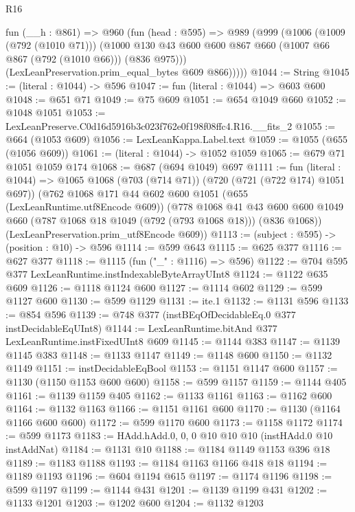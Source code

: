 \begin{lexlean}{R16}
\begin{coremodule}
      fun (__h : @861) =>
      @960
        (fun (head : @595) =>
        @989
          (@999
            (@1006
              (@1009 (@792 (@1010 @71)))
              (@1000 @130 @43 @600 @600 @867 @660 (@1007 @66 @867 (@792 (@1010 @66))) (@836 @975)))
            (LexLeanPreservation.prim_equal_bytes @609 @866)))))
@1044 := String
@1045 := (literal : @1044) -> @596
@1047 := fun (literal : @1044) => @603 @600
@1048 := @651 @71
@1049 := @75 @609
@1051 := @654 @1049 @660
@1052 := @1048 @1051
@1053 := LexLeanPreserve.C0d16d5916b3c023f762e0f198f08ffc4.R16.__fits_2
@1055 := @664 (@1053 @609)
@1056 := LexLeanKappa.Label.text
@1059 := @1055 (@655 (@1056 @609))
@1061 := (literal : @1044) -> @1052 @1059
@1065 := @679 @71 @1051 @1059 @174
@1068 := @687 (@694 @1049) @697
@1111 := fun (literal : @1044) =>
  @1065
    @1068
    (@703 (@714 @71))
    (@720 (@721 (@722 @174) @1051 @697))
    (@762
      @1068
      @171
      @44
      @602
      @600
      @1051
      (@655 (LexLeanRuntime.utf8Encode @609))
      (@778
        @1068
        @41
        @43
        @600
        @600
        @1049
        @660
        (@787 @1068 @18 @1049 (@792 (@793 @1068 @18)))
        (@836 @1068))
      (LexLeanPreservation.prim_utf8Encode @609))
@1113 := (subject : @595) -> (position : @10) -> @596
@1114 := @599 @643
@1115 := @625 @377
@1116 := @627 @377
@1118 := @1115 (fun ("_" : @1116) => @596)
@1122 := @704 @595 @377 LexLeanRuntime.instIndexableByteArrayUInt8
@1124 := @1122 @635 @609
@1126 := @1118 @1124 @600
@1127 := @1114 @602
@1129 := @599 @1127 @600
@1130 := @599 @1129
@1131 := ite.{1}
@1132 := @1131 @596
@1133 := @854 @596
@1139 := @748 @377 (instBEqOfDecidableEq.{0} @377 instDecidableEqUInt8)
@1144 := LexLeanRuntime.bitAnd @377 LexLeanRuntime.instFixedUInt8 @609
@1145 := @1144 @383
@1147 := @1139 @1145 @383
@1148 := @1133 @1147
@1149 := @1148 @600
@1150 := @1132 @1149
@1151 := instDecidableEqBool
@1153 := @1151 @1147 @600
@1157 := @1130 (@1150 @1153 @600 @600)
@1158 := @599 @1157
@1159 := @1144 @405
@1161 := @1139 @1159 @405
@1162 := @1133 @1161
@1163 := @1162 @600
@1164 := @1132 @1163
@1166 := @1151 @1161 @600
@1170 := @1130 (@1164 @1166 @600 @600)
@1172 := @599 @1170 @600
@1173 := @1158 @1172
@1174 := @599 @1173
@1183 := HAdd.hAdd.{0, 0, 0} @10 @10 @10 (instHAdd.{0} @10 instAddNat)
@1184 := @1131 @10
@1188 := @1184 @1149 @1153 @396 @18
@1189 := @1183 @1188
@1193 := @1184 @1163 @1166 @418 @18
@1194 := @1189 @1193
@1196 := @604 @1194 @615
@1197 := @1174 @1196
@1198 := @599 @1197
@1199 := @1144 @431
@1201 := @1139 @1199 @431
@1202 := @1133 @1201
@1203 := @1202 @600
@1204 := @1132 @1203

\end{coremodule}
\end{lexlean}

